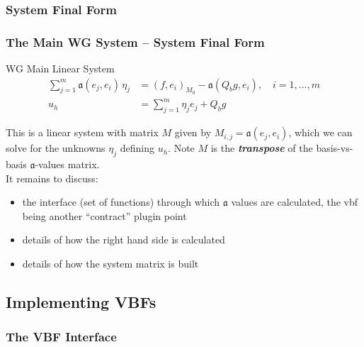\documentclass[compress]{beamer}
\begin{document}
\subsubsection{System Final Form}

\begin{frame}
  \frametitle{The Main WG System -- System Final Form}
  \begin{block}{WG Main Linear System}
    \begin{align*}
      \sum_{j=1}^m{\mathfrak{a}(e_j, e_i) \,\eta_j} &= (f, e_i)_{M_0} - \mathfrak{a}(Q_b g, e_i), \quad i=1,\dots,m\\
      u_h &= \sum_{j=1}^m{\eta_j e_j} + Q_b g
    \end{align*}

  \end{block}  
  \pause
  This is a linear system with matrix $M$ given by $M_{i,j} = \mathfrak{a}(e_j, e_i)$, which we can solve for the unknowns
  $\eta_j$ defining $u_h$.  Note $M$ is the \emph{\textbf{transpose}} of the basis-vs-basis $\mathfrak{a}$-values matrix.\\
  \pause
  It remains to discuss:
  \begin{itemize}[<+->]
    \item the interface (set of functions) through which $\mathfrak{a}$ values are calculated,
      the vbf being another ``contract'' plugin point
    \item details of how the right hand side is calculated
    \item details of how the system matrix is built
  \end{itemize}

\end{frame}

\subsection{Implementing VBFs}

\subsubsection{The VBF Interface}
\end{document}
